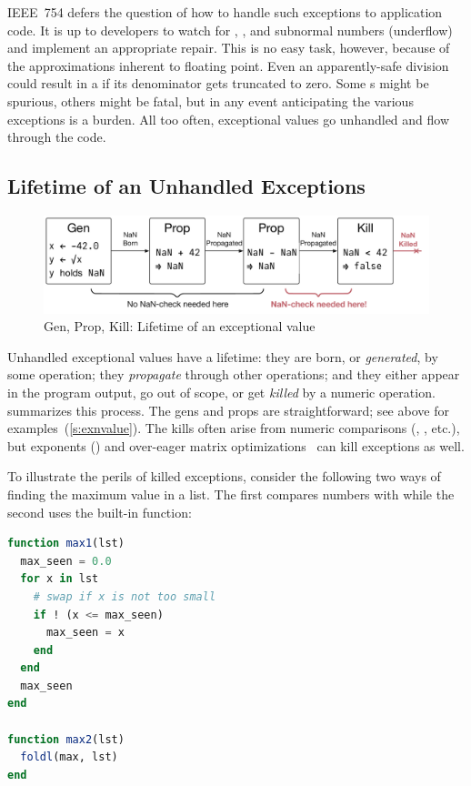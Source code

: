 \documentclass{juliacon}
\begin{document}
IEEE~754 defers the question of how to handle such exceptions to application code.
It is up to developers to watch for \Nan{}, \Inf{}, and subnormal numbers (underflow)
and implement an appropriate repair.
This is no easy task, however, because of the approximations inherent to
floating point.
Even an apparently-safe division could result in a \Nan{} if its
denominator gets truncated to zero.
Some \Nan{}s might be spurious, others might be fatal, but in any event
anticipating the various exceptions is a burden.
All too often, exceptional values go unhandled and flow through the code.


\subsection{Lifetime of an Unhandled Exceptions}
\label{s:to-kill-a-fp}

\begin{figure}[t]
  \includegraphics[width=\columnwidth]{fig/genpropkill-outline_vector.pdf}
  \caption{Gen, Prop, Kill: Lifetime of an exceptional value}
  \label{f:gpk}
\end{figure}

Unhandled exceptional values have a lifetime: they are born, or \emph{generated}, by some operation; they \emph{propagate} through other operations; and they either appear in the program output, go out of scope, or get \emph{killed} by a numeric operation.
 summarizes this \genpropkill{} process.
The gens and props are straightforward; see above for examples~(\cref{s:exnvalue}).
The kills often arise from numeric comparisons (\code{<}, \code{=}, etc.),
but exponents () and over-eager matrix
optimizations~\cite{ddghlllprr-correctness-2022} can kill exceptions as well.

To illustrate the perils of killed exceptions, consider the following two ways
of finding the maximum value in a list.
The first compares numbers with \code{<=}
while the second uses the built-in  function:

\begin{lstlisting}[language = Julia]
function max1(lst)
  max_seen = 0.0
  for x in lst
    # swap if x is not too small
    if ! (x <= max_seen)
      max_seen = x
    end
  end
  max_seen
end

function max2(lst)
  foldl(max, lst)
end
\end{lstlisting}
\end{document}
